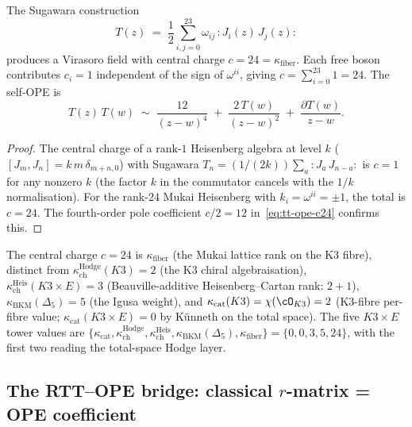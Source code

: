 \begin{proposition}[Sugawara stress tensor at \texorpdfstring{$c = 24$}{c = 24}]
\label{prop:sugawara-c24}
The Sugawara construction
\begin{equation}\label{eq:sugawara-mukai}
 T(z) \;=\; \frac{1}{2}\sum_{i,j=0}^{23} \omega_{ij}\, {:}J_i(z)\, J_j(z){:}
\end{equation}
produces a Virasoro field with central charge $c = 24 = \kappa_{\mathrm{fiber}}$. Each free boson contributes $c_i = 1$ independent of the sign of $\omega^{ii}$, giving $c = \sum_{i=0}^{23} 1 = 24$. The self-OPE is
\begin{equation}\label{eq:tt-ope-c24}
 T(z)\, T(w) \;\sim\; \frac{12}{(z - w)^4} \;+\; \frac{2\, T(w)}{(z - w)^2} \;+\; \frac{\partial T(w)}{z - w}.
\end{equation}
\end{proposition}

\begin{proof}
The central charge of a rank-$1$ Heisenberg algebra at level $k$ ($[J_m, J_n] = k\, m\, \delta_{m+n,0}$) with Sugawara $T_n = (1/(2k)) \sum_a {:}J_a\, J_{n-a}{:}$ is $c = 1$ for any nonzero $k$ (the factor $k$ in the commutator cancels with the $1/k$ normalisation). For the rank-$24$ Mukai Heisenberg with $k_i = \omega^{ii} = \pm 1$, the total is $c = 24$. The fourth-order pole coefficient $c/2 = 12$ in~\eqref{eq:tt-ope-c24} confirms this.
\end{proof}

\begin{remark}
The central charge $c = 24$ is $\kappa_{\mathrm{fiber}}$ (the Mukai lattice rank on the K3 fibre), distinct from $\kappa_{\mathrm{ch}}^{\mathrm{Hodge}}(K3) = 2$ (the K3 chiral algebraisation), $\kappa_{\mathrm{ch}}^{\mathrm{Heis}}(K3 \times E) = 3$ (Beauville-additive Heisenberg--Cartan rank: $2 + 1$), $\kappa_{\mathrm{BKM}}(\Delta_5) = 5$ (the Igusa weight), and $\kappa_{\mathrm{cat}}(K3) = \chi(\cO_{K3}) = 2$ (K3-fibre per-fibre value; $\kappa_{\mathrm{cat}}(K3 \times E) = 0$ by K\"unneth on the total space). The five $K3 \times E$ tower values are $\{\kappa_{\mathrm{cat}}, \kappa_{\mathrm{ch}}^{\mathrm{Hodge}}, \kappa_{\mathrm{ch}}^{\mathrm{Heis}}, \kappa_{\mathrm{BKM}}(\Delta_5), \kappa_{\mathrm{fiber}}\} = \{0, 0, 3, 5, 24\}$, with the first two reading the total-space Hodge layer.
\end{remark}

\subsection{The RTT--OPE bridge: classical \texorpdfstring{$r$}{r}-matrix = OPE coefficient}
\label{subsec:rtt-ope-bridge}

